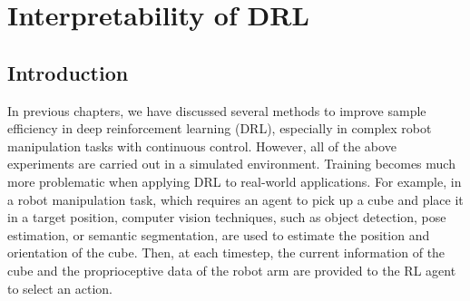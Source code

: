 \chapter{Interpretability of DRL}
\label{ch:drl_interp}
\section{Introduction}
In previous chapters, we have discussed several methods to improve sample efficiency in deep reinforcement learning (DRL), especially in complex robot manipulation tasks with continuous control. However, all of the above experiments are carried out in a simulated environment. Training becomes much more problematic when applying DRL to real-world applications. For example, in a robot manipulation task, which requires an agent to pick up a cube and place it in a target position, computer vision techniques, such as object detection, pose estimation, or semantic segmentation, are used to estimate the position and orientation of the cube. Then, at each timestep, the current information of the cube and the proprioceptive data of the robot arm are provided to the RL agent to select an action. 

